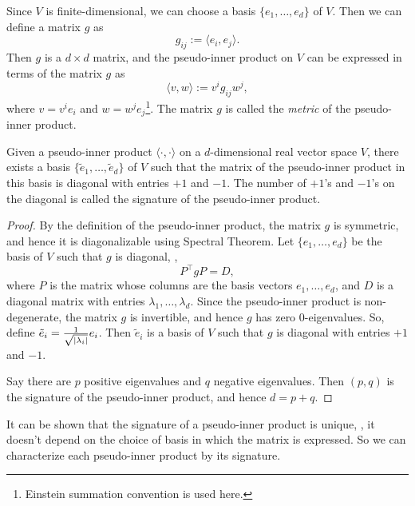 Since \(V\) is finite-dimensional, we can choose a basis \(\{e_1, \dots, e_d\}\) of \(V\). Then we can define a matrix \(g\) as
\begin{equation*}
    g_{ij} := \langle e_i, e_j \rangle.
\end{equation*}
Then \(g\) is a \(d \times d\) matrix, and the pseudo-inner product on \(V\) can be expressed in terms of the matrix \(g\) as
\begin{equation*}
    \langle v, w \rangle := v^i g_{ij} w^j,
\end{equation*}
where \(v = v^i e_i\) and \(w = w^j e_j\)\footnote{Einstein summation convention is used here.}. The matrix \(g\) is called the \emph{metric} of the pseudo-inner product.
\begin{theorem}
    Given a pseudo-inner product \(\langle \cdot, \cdot \rangle\) on a \(d\)-dimensional real vector space \(V\), there exists a basis \(\{\tilde{e}_1, \dots, \tilde{e}_d\}\) of \(V\) such that the matrix of the pseudo-inner product in this basis is diagonal with entries \(+1\) and \(-1\). The number of \(+1\)'s and \(-1\)'s on the diagonal is called the signature of the pseudo-inner product.
\end{theorem}
\begin{proof}
    By the definition of the pseudo-inner product, the matrix \(g\) is symmetric, and hence it is diagonalizable using Spectral Theorem. Let \(\{e_1, \dots, e_d\}\) be the basis of \(V\) such that \(g\) is diagonal, \ie,
    \begin{equation*}
        P^\top g P = D,
    \end{equation*}
    where \(P\) is the matrix whose columns are the basis vectors \(e_1, \dots, e_d\), and \(D\) is a diagonal matrix with entries \(\lambda_1, \dots, \lambda_d\). Since the pseudo-inner product is non-degenerate, the matrix \(g\) is invertible, and hence \(g\) has zero 0-eigenvalues. So, define \(\tilde{e}_i = \frac{1}{\sqrt{\abs{\lambda_i}}} e_i\). Then \(\tilde{e}_i\) is a basis of \(V\) such that \(g\) is diagonal with entries \(+1\) and \(-1\).

    Say there are \(p\) positive eigenvalues and \(q\) negative eigenvalues. Then \((p, q)\) is the signature of the pseudo-inner product, and hence \(d = p + q\).
\end{proof}
It can be shown that the signature of a pseudo-inner product is unique, \ie, it doesn't depend on the choice of basis in which the matrix is expressed. So we can characterize each pseudo-inner product by its signature.


